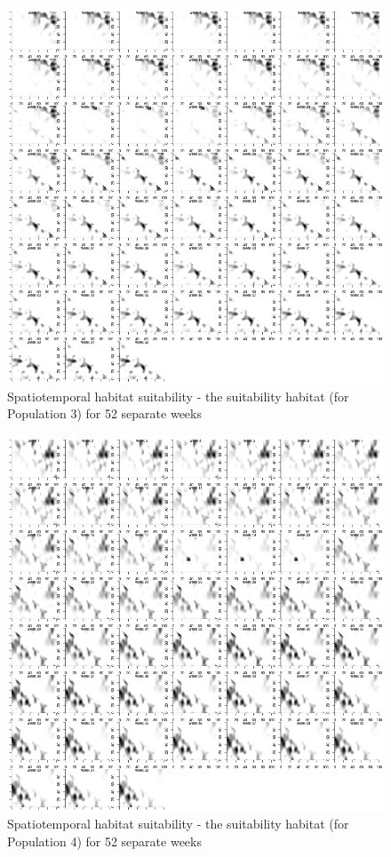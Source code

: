 \documentclass[review]{elsarticle}
\begin{document}
\begin{figure}[!ht]
	\includegraphics[width = \linewidth]{Plots/habitat_spatiotemp_spp_3}
	\caption{Spatiotemporal habitat suitability - the suitability habitat
		(for Population 3) for 52 separate weeks}
	\label{fig:7}
\end{figure}

\begin{figure}[!ht]
	\includegraphics[width = \linewidth]{Plots/habitat_spatiotemp_spp_4}
	\caption{Spatiotemporal habitat suitability - the suitability habitat
		(for Population 4) for 52 separate weeks}
	\label{fig:8}
\end{figure}
\end{document}
